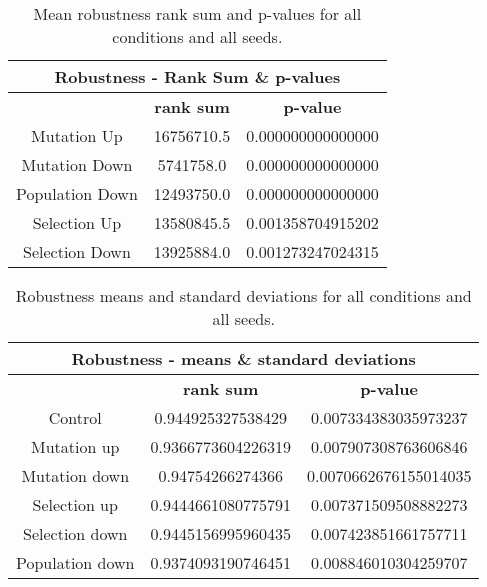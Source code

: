 \begin{table}
	\begin{tabular}{|c|c|c}
		\hline
		\multicolumn{3}{|c|}{\Large \textbf{Robustness - Rank Sum \& p-values}} \\
		\hline
		 & \textbf{rank sum} & \textbf{p-value} \\
		 \hline
		Mutation Up & 16756710.5 & 0.000000000000000 \\
		\hline
		Mutation Down & 5741758.0 & 0.000000000000000 \\
		\hline
		Population Down & 12493750.0 & 0.000000000000000 \\
		\hline
		Selection Up & 13580845.5 &	0.001358704915202 \\
		\hline
		Selection Down & 13925884.0 & 0.001273247024315 \\
		\hline
	\end{tabular}
	\caption[Robustness rank sum \& p-values]{Mean robustness rank sum and p-values for all conditions and all seeds.}
	\label{table:rank_sum_p-values}
\end{table}
\begin{table}[H]
	\begin{tabular}{|c|c|c|}
		\hline
		\multicolumn{3}{|c|}{\Large \textbf{Robustness - means \& standard deviations}} \\
		\hline
		& \textbf{rank sum} & \textbf{p-value} \\
		\hline
		Control & 0.944925327538429	& 0.007334383035973237 \\
		\hline
		Mutation up & 0.9366773604226319 & 0.007907308763606846 \\
		\hline
		Mutation down &	0.94754266274366 & 0.0070662676155014035 \\
		\hline
 		Selection up & 0.9444661080775791 & 0.007371509508882273 \\
 		\hline
		Selection down & 0.9445156995960435	& 0.007423851661757711 \\
		\hline
		Population down & 0.9374093190746451 & 0.008846010304259707 \\
		\hline
	\end{tabular}
	\caption[Robustness means and standard deviations]{Robustness means and standard deviations for all conditions and all seeds.}
	\label{table:robustness_means_and_std_dev}
\end{table}


